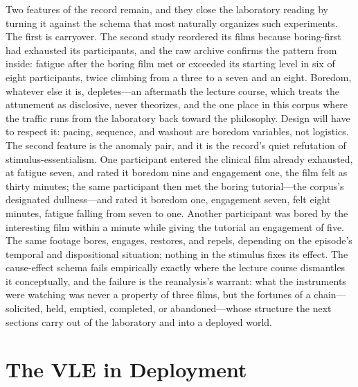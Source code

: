 \documentclass{article}
\begin{document}
Two features of the record remain, and they close the laboratory reading by turning it against the schema that most naturally organizes such experiments. The first is carryover. The second study reordered its films because boring-first had exhausted its participants, and the raw archive confirms the pattern from inside: fatigue after the boring film met or exceeded its starting level in six of eight participants, twice climbing from a three to a seven and an eight. Boredom, whatever else it is, depletes---an aftermath the lecture course, which treats the attunement as disclosive, never theorizes, and the one place in this corpus where the traffic runs from the laboratory back toward the philosophy. Design will have to respect it: pacing, sequence, and washout are boredom variables, not logistics. The second feature is the anomaly pair, and it is the record's quiet refutation of stimulus-essentialism. One participant entered the clinical film already exhausted, at fatigue seven, and rated it boredom nine and engagement one, the film felt as thirty minutes; the same participant then met the boring tutorial---the corpus's designated dullness---and rated it boredom one, engagement seven, felt eight minutes, fatigue falling from seven to one. Another participant was bored by the interesting film within a minute while giving the tutorial an engagement of five. The same footage bores, engages, restores, and repels, depending on the episode's temporal and dispositional situation; nothing in the stimulus fixes its effect. The cause-effect schema fails empirically exactly where the lecture course dismantles it conceptually, and the failure is the reanalysis's warrant: what the instruments were watching was never a property of three films, but the fortunes of a chain---solicited, held, emptied, completed, or abandoned---whose structure the next sections carry out of the laboratory and into a deployed world.

\section{The VLE in Deployment}
\end{document}
